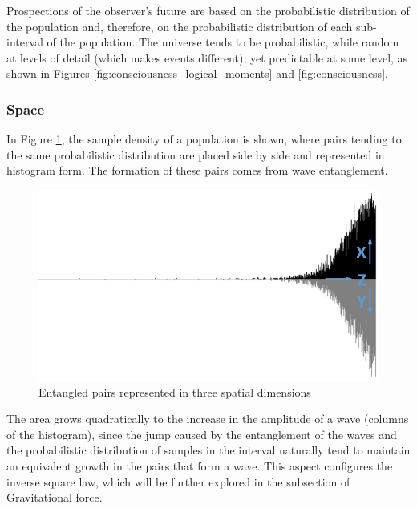 Prospections of the observer's future are based on the probabilistic distribution of the population and, therefore, on the probabilistic distribution of each sub-interval of the population. The universe tends to be probabilistic, while random at levels of detail (which makes events different), yet predictable at some level, as shown in Figures \ref{fig:consciousness_logical_moments} and \ref{fig:consciousness}. 

\subsubsection{Space}
In Figure \ref{fig:consciousness_space_waves}, the sample density of a population is shown, where pairs tending to the same probabilistic distribution are placed side by side and represented in histogram form. The formation of these pairs comes from wave entanglement.
	\begin{figure}[H]
	\caption{Entangled pairs represented in three spatial dimensions}
	\label{fig:consciousness_space_waves}
	\centering
	\includegraphics[scale=.7]{sections/images/consciousness_space_waves.jpg}
	\end{figure}

The area grows quadratically to the increase in the amplitude of a wave (columns of the histogram), since the jump caused by the entanglement of the waves and the probabilistic distribution of samples in the interval naturally tend to maintain an equivalent growth in the pairs that form a wave. This aspect configures the inverse square law, which will be further explored in the subsection of Gravitational force.

